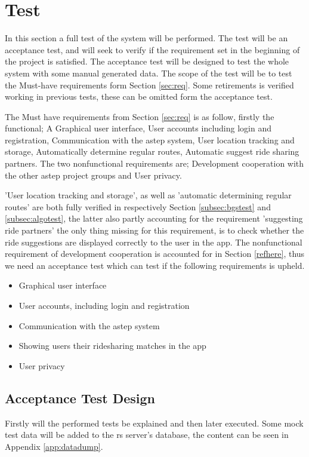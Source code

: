 \section{Test}
In this section a full test of the system will be performed.
The test will be an acceptance test, and will seek to verify if the requirement set in the beginning of the project is satisfied.
The acceptance test will be designed to test the whole system with some manual generated data.
The scope of the test will be to test the Must-have requirements form Section \ref{sec:req}.
Some retirements is verified working in previous tests, these can be omitted form the acceptance test. 

The Must have requirements from Section \ref{sec:req} is as follow, firstly the functional; A Graphical user interface, User accounts including login and registration, Communication with the \gls{astep} system, User location tracking and storage, Automatically determine regular routes, Automatic suggest ride sharing partners. The two nonfunctional requirements are; Development cooperation with the other \gls{astep} project groups and User privacy.

'User location tracking and storage', as well as 'automatic determining regular routes' are both fully verified in respectively Section \ref{subsec:bgstest} and \ref{subsec:algotest}, the latter also partly accounting for the requirement 'suggesting ride partners' the only thing missing for this requirement, is to check whether the ride suggestions are displayed correctly to the user in the app. 
The nonfunctional requirement of development cooperation is accounted for in Section \ref{refhere}, thus we need an acceptance test which can test if the following requirements is upheld. 
\begin{itemize}
	\item Graphical user interface
	\item User accounts, including login and registration
	\item Communication with the \gls{astep} system
	\item Showing users their ridesharing matches in the app
	\item User privacy
\end{itemize}

\subsection{Acceptance Test Design}
Firstly will the performed tests be explained and then later executed.
Some mock test data will be added to the \gls{rs} server's database, the content can be seen in Appendix \ref{app:datadump}.

